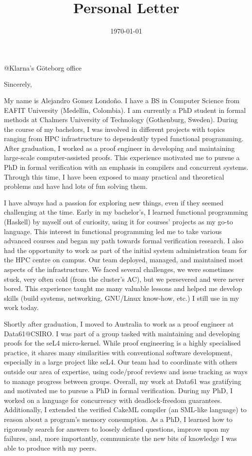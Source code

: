 \documentclass[11pt,a4paper,sans]{moderncv}        %
\title{Personal Letter}                               %
\begin{document}

          {@Klarna's Göteborg office}
\date{\today}

\opening{}

\closing{Sincerely,}

\makelettertitle

\justify

My name is Alejandro Gomez Londoño. I have a BS in Computer Science
from EAFIT University (Medellin, Colombia). I am currently a PhD
student in formal methods at Chalmers University of Technology
(Gothenburg, Sweden). During the course of my bachelors, I was
involved in different projects with topics ranging from HPC
infrastructure to dependently typed functional programming. After
graduation, I worked as a proof engineer in developing and maintaining
large-scale computer-assisted proofs. This experience motivated me to
pursue a PhD in formal verification with an emphasis in compilers and
concurrent systems. Through this time, I have been exposed to many
practical and theoretical problems and have had lots of fun solving
them.

I have always had a passion for exploring new things, even if they
seemed challenging at the time.
%
Early in my bachelor's, I learned functional programming (Haskell) by
myself out of curiosity, using it for courses' projects as my go-to
language. This interest in functional programming led me to take
various advanced courses and began my path towards formal verification
research.
%
I also had the opportunity to work as part of the initial system
administration team for the HPC centre on campus. Our team deployed,
managed, and maintained most aspects of the infrastructure. We faced
several challenges, we were sometimes stuck, very often cold (from the
cluster's AC), but we persevered and were never bored. This experience
taught me many valuable lessons and helped me develop skills (build
systems, networking, GNU/Linux know-how, etc.) I still use in my work
today.

Shortly after graduation, I moved to Australia to work as a proof
engineer at Data61@CSIRO. I was part of a group tasked with
maintaining and developing proofs for the seL4 micro-kernel. While
proof engineering is a highly specialised practice, it shares many
similarities with conventional software development, especially in a
large project like seL4. Our team had to coordinate with others
outside our area of expertise, using code/proof reviews and issue
tracking as ways to manage progress between groups. Overall, my work
at Data61 was gratifying and motivated me to pursue a PhD in formal
verification.
%
During my PhD, I worked on a language for concurrency with
deadlock-freedom guarantees. Additionally, I extended the verified
CakeML compiler (an SML-like language) to reason about a program's
memory consumption. As a PhD, I learned how to rigorously search for
answers to loosely defined questions, improve upon my failures, and,
more importantly, communicate the new bits of knowledge I was able to
produce with my peers.
\end{document}
